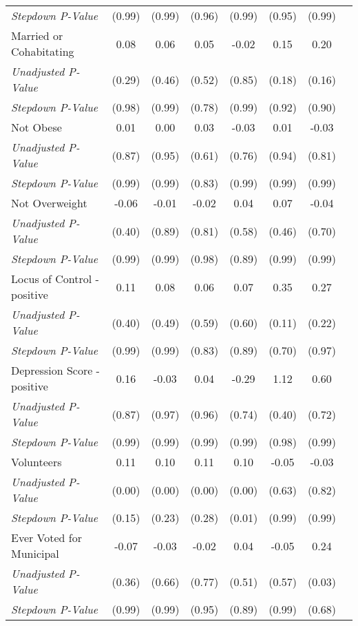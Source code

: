\begin{tabular}{l c c c c c c c}
\quad \textit{Stepdown P-Value} & (0.99) & (0.99) & (0.96) & (0.99) & (0.95) & (0.99) \\
Married or Cohabitating & 0.08 & 0.06 & 0.05 & -0.02 & 0.15 & 0.20 \\
\quad \textit{Unadjusted P-Value} & (0.29) & (0.46) & (0.52) & (0.85) & (0.18) & (0.16) \\
\quad \textit{Stepdown P-Value} & (0.98) & (0.99) & (0.78) & (0.99) & (0.92) & (0.90) \\
Not Obese & 0.01 & 0.00 & 0.03 & -0.03 & 0.01 & -0.03 \\
\quad \textit{Unadjusted P-Value} & (0.87) & (0.95) & (0.61) & (0.76) & (0.94) & (0.81) \\
\quad \textit{Stepdown P-Value} & (0.99) & (0.99) & (0.83) & (0.99) & (0.99) & (0.99) \\
Not Overweight & -0.06 & -0.01 & -0.02 & 0.04 & 0.07 & -0.04 \\
\quad \textit{Unadjusted P-Value} & (0.40) & (0.89) & (0.81) & (0.58) & (0.46) & (0.70) \\
\quad \textit{Stepdown P-Value} & (0.99) & (0.99) & (0.98) & (0.89) & (0.99) & (0.99) \\
Locus of Control - positive & 0.11 & 0.08 & 0.06 & 0.07 & 0.35 & 0.27 \\
\quad \textit{Unadjusted P-Value} & (0.40) & (0.49) & (0.59) & (0.60) & (0.11) & (0.22) \\
\quad \textit{Stepdown P-Value} & (0.99) & (0.99) & (0.83) & (0.89) & (0.70) & (0.97) \\
Depression Score - positive & 0.16 & -0.03 & 0.04 & -0.29 & 1.12 & 0.60 \\
\quad \textit{Unadjusted P-Value} & (0.87) & (0.97) & (0.96) & (0.74) & (0.40) & (0.72) \\
\quad \textit{Stepdown P-Value} & (0.99) & (0.99) & (0.99) & (0.99) & (0.98) & (0.99) \\
Volunteers & 0.11 & 0.10 & 0.11 & 0.10 & -0.05 & -0.03 \\
\quad \textit{Unadjusted P-Value} & (0.00) & (0.00) & (0.00) & (0.00) & (0.63) & (0.82) \\
\quad \textit{Stepdown P-Value} & (0.15) & (0.23) & (0.28) & (0.01) & (0.99) & (0.99) \\
Ever Voted for Municipal & -0.07 & -0.03 & -0.02 & 0.04 & -0.05 & 0.24 \\
\quad \textit{Unadjusted P-Value} & (0.36) & (0.66) & (0.77) & (0.51) & (0.57) & (0.03) \\
\quad \textit{Stepdown P-Value} & (0.99) & (0.99) & (0.95) & (0.89) & (0.99) & (0.68) \\

\end{tabular}
